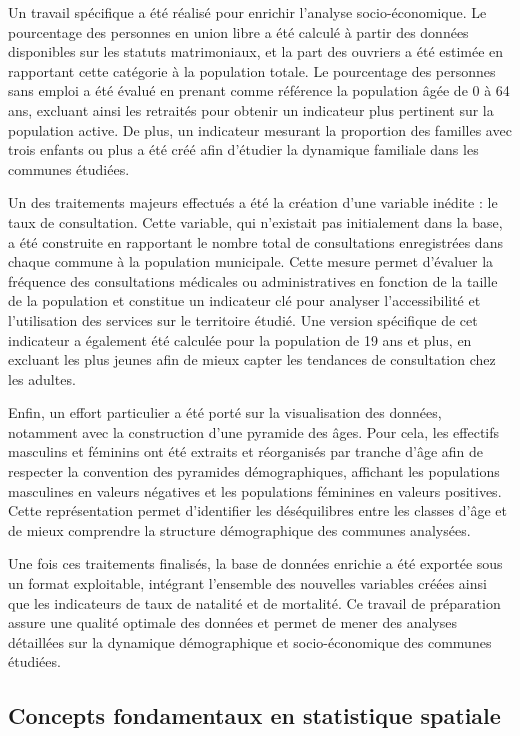 \documentclass[
]{article}
\begin{document}
Un travail spécifique a été réalisé pour enrichir l'analyse
socio-économique. Le pourcentage des personnes en union libre a été
calculé à partir des données disponibles sur les statuts matrimoniaux,
et la part des ouvriers a été estimée en rapportant cette catégorie à la
population totale. Le pourcentage des personnes sans emploi a été évalué
en prenant comme référence la population âgée de 0 à 64 ans, excluant
ainsi les retraités pour obtenir un indicateur plus pertinent sur la
population active. De plus, un indicateur mesurant la proportion des
familles avec trois enfants ou plus a été créé afin d'étudier la
dynamique familiale dans les communes étudiées.

Un des traitements majeurs effectués a été la création d'une variable
inédite : le taux de consultation. Cette variable, qui n'existait pas
initialement dans la base, a été construite en rapportant le nombre
total de consultations enregistrées dans chaque commune à la population
municipale. Cette mesure permet d'évaluer la fréquence des consultations
médicales ou administratives en fonction de la taille de la population
et constitue un indicateur clé pour analyser l'accessibilité et
l'utilisation des services sur le territoire étudié. Une version
spécifique de cet indicateur a également été calculée pour la population
de 19 ans et plus, en excluant les plus jeunes afin de mieux capter les
tendances de consultation chez les adultes.

Enfin, un effort particulier a été porté sur la visualisation des
données, notamment avec la construction d'une pyramide des âges. Pour
cela, les effectifs masculins et féminins ont été extraits et
réorganisés par tranche d'âge afin de respecter la convention des
pyramides démographiques, affichant les populations masculines en
valeurs négatives et les populations féminines en valeurs positives.
Cette représentation permet d'identifier les déséquilibres entre les
classes d'âge et de mieux comprendre la structure démographique des
communes analysées.

Une fois ces traitements finalisés, la base de données enrichie a été
exportée sous un format exploitable, intégrant l'ensemble des nouvelles
variables créées ainsi que les indicateurs de taux de natalité et de
mortalité. Ce travail de préparation assure une qualité optimale des
données et permet de mener des analyses détaillées sur la dynamique
démographique et socio-économique des communes étudiées.

\hypertarget{concepts-fondamentaux-en-statistique-spatiale}{%
\subsection{Concepts fondamentaux en statistique
spatiale}\label{concepts-fondamentaux-en-statistique-spatiale}}
\end{document}
